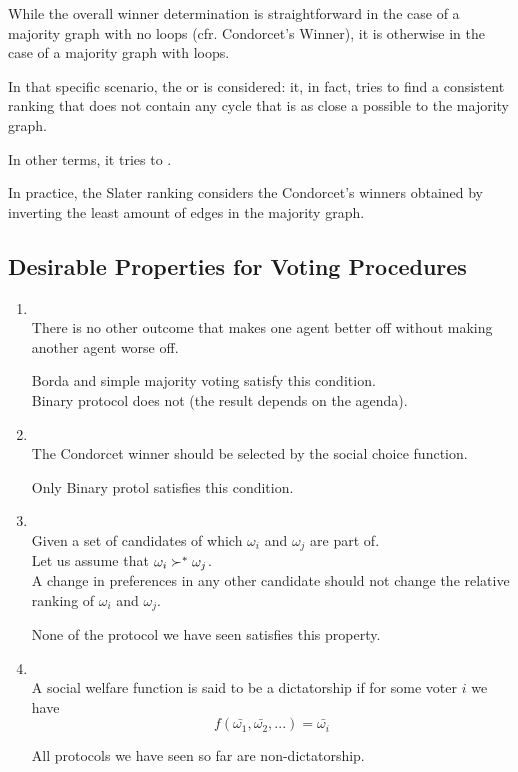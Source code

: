 While the overall winner determination is straightforward in the case of a majority graph with no loops (cfr. Condorcet's Winner), it is otherwise in the case of a majority graph with loops.

In that specific scenario, the  or  is considered: it, in fact, tries to find a consistent ranking that does not contain any cycle that is as close a possible to the majority graph.

In other terms, it tries to .

In practice, the Slater ranking considers the Condorcet's winners obtained by inverting the least amount of edges in the majority graph.
\subsection{Desirable Properties for Voting Procedures}
\begin{enumerate}
\item {}\\
There is no other outcome that makes one agent better off without making another agent worse off.

Borda and simple majority voting satisfy this condition.\\
Binary protocol does not (the result depends on the agenda).
\item {}\\
The Condorcet winner should be selected by the social choice function.

Only Binary protol satisfies this condition.
\item {}\\
Given a set of candidates of which $\omega_i$ and $\omega_j$ are part of. \\
Let us assume that $\omega_i \succ^* \omega_j$.\\
A change in preferences in any other candidate should not change the relative ranking of $\omega_i$ and $\omega_j$.

None of the protocol we have seen satisfies this property.
\item {}\\
A social welfare function is said to be a dictatorship if for some voter $i$ we have
\[f(\bar{\omega_1}, \bar{\omega_2}, ...) = \bar{\omega_i}\]

All protocols we have seen so far are non-dictatorship.
\end{enumerate}

